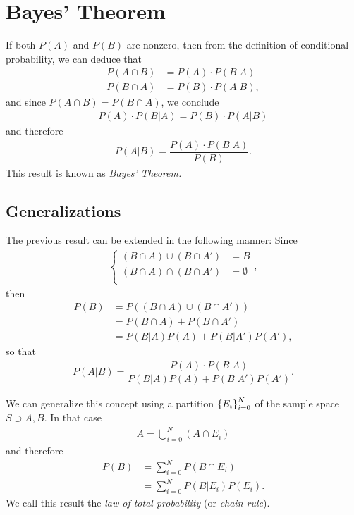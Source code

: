 \section{Bayes' Theorem}

If both $ P(A) $ and $ P(B) $ are nonzero, then from the definition of conditional probability, we can deduce that 
\begin{align}
	P(A \cap B) &=P(A)\cdot P(B|A)\\
	P(B \cap A) &=P(B)\cdot P(A|B),
\end{align}
and since $ P(A\cap B)= P(B\cap A) $, we conclude 
\begin{align}
	P(A)\cdot P(B|A) = P(B)\cdot P(A|B)
\end{align}
and therefore 
\begin{align}
	P(A|B)=\dfrac{P(A)\cdot P(B|A)}{P(B)}.
\end{align}
This result is known as \emph{Bayes' Theorem.}

\subsection{Generalizations}

The previous result can be extended in the following manner: Since 
\begin{align}
	\begin{cases}
		(B\cap A) \cup (B \cap A') &= B\\
		(B\cap A) \cap (B \cap A') &= \emptyset\\
	\end{cases},
\end{align}
then
\begin{align}
	P(B) & = P\left( (B\cap A) \cup (B \cap A') \right)\\
	&= P(B\cap A) + P(B\cap A')\\
	&= P(B|A)P(A) + P(B|A')P(A'),
\end{align}
so that 
\begin{align}
	P(A|B)=\dfrac{P(A)\cdot P(B|A)}{P(B|A)P(A) + P(B|A')P(A')}.
\end{align}

We can generalize this concept using a partition $ \left\{ E_i \right\}_{i=0}^{N} $ of the sample space $ S \supset A, B$. In that case
\begin{align}
	A = \bigcup_{i=0}^{N}(A\cap E_i)
\end{align}
and therefore
\begin{align}
	P(B) &= \sum_{i=0}^{N} P(B\cap E_i)\\
	&= \sum_{i=0}^{N} P(B|E_i)P(E_i).
\end{align}
We call this result the \emph{law of total probability} (or \emph{chain rule}).


